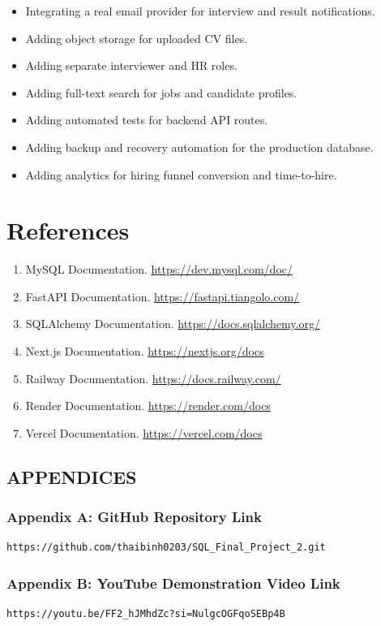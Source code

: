 \documentclass[11pt,a4paper]{report}
\begin{document}
\begin{itemize}[leftmargin=1.5cm]
  \item Integrating a real email provider for interview and result notifications.
  \item Adding object storage for uploaded CV files.
  \item Adding separate interviewer and HR roles.
  \item Adding full-text search for jobs and candidate profiles.
  \item Adding automated tests for backend API routes.
  \item Adding backup and recovery automation for the production database.
  \item Adding analytics for hiring funnel conversion and time-to-hire.
\end{itemize}


\chapter*{References}

\begin{enumerate}[leftmargin=1.5cm]
  \item MySQL Documentation. \url{https://dev.mysql.com/doc/}
  \item FastAPI Documentation. \url{https://fastapi.tiangolo.com/}
  \item SQLAlchemy Documentation. \url{https://docs.sqlalchemy.org/}
  \item Next.js Documentation. \url{https://nextjs.org/docs}
  \item Railway Documentation. \url{https://docs.railway.com/}
  \item Render Documentation. \url{https://render.com/docs}
  \item Vercel Documentation. \url{https://vercel.com/docs}
\end{enumerate}

\section*{APPENDICES}

\subsection*{Appendix A: GitHub Repository Link}

\begin{verbatim}
https://github.com/thaibinh0203/SQL_Final_Project_2.git
\end{verbatim}

\subsection*{Appendix B: YouTube Demonstration Video Link}

\begin{verbatim}
https://youtu.be/FF2_hJMhdZc?si=NulgcOGFqoSEBp4B
\end{verbatim}
\end{document}
